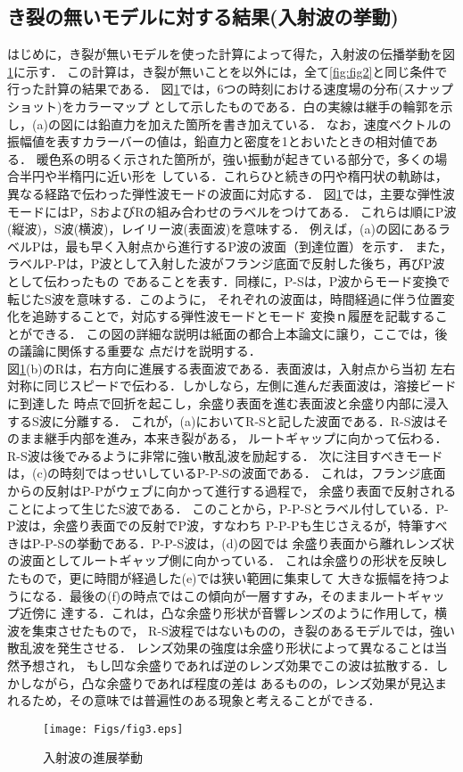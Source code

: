 \documentclass{jsce}
\begin{document}
\subsection{き裂の無いモデルに対する結果(入射波の挙動)}
はじめに，き裂が無いモデルを使った計算によって得た，入射波の伝播挙動を図\ref{fig:fig3}に示す．
この計算は，き裂が無いことを以外には，全て\ref{fig:fig2}と同じ条件で行った計算の結果である．
図\ref{fig:fig3}では，6つの時刻における速度場の分布(スナップショット)をカラーマップ
として示したものである．白の実線は継手の輪郭を示し，(a)の図には鉛直力を加えた箇所を書き加えている．
なお，速度ベクトルの振幅値を表すカラーバーの値は，鉛直力と密度を1とおいたときの相対値である．
暖色系の明るく示された箇所が，強い振動が起きている部分で，多くの場合半円や半楕円に近い形を
している．これらひと続きの円や楕円状の軌跡は，異なる経路で伝わった弾性波モードの波面に対応する．
図\ref{fig:fig3}では，主要な弾性波モードにはP，SおよびRの組み合わせのラベルをつけてある．
これらは順にP波(縦波)，S波(横波)，レイリー波(表面波)を意味する．
例えば，(a)の図にあるラベルPは，最も早く入射点から進行するP波の波面（到達位置）を示す．
また，ラベルP-Pは，P波として入射した波がフランジ底面で反射した後ち，再びP波として伝わったもの
であることを表す．同様に，P-Sは，P波からモード変換で転じたS波を意味する．このように，
それぞれの波面は，時間経過に伴う位置変化を追跡することで，対応する弾性波モードとモード
変換ｎ履歴を記載することができる．
この図の詳細な説明は紙面の都合上本論文に譲り，ここでは，後の議論に関係する重要な
点だけを説明する．\\
図\ref{fig:fig3}(b)のRは，右方向に進展する表面波である．表面波は，入射点から当初
左右対称に同じスピードで伝わる．しかしなら，左側に進んだ表面波は，溶接ビードに到達した
時点で回折を起こし，余盛り表面を進む表面波と余盛り内部に浸入するS波に分離する．
これが，(a)においてR-Sと記した波面である．R-S波はそのまま継手内部を進み，本来き裂がある，
ルートギャップに向かって伝わる．R-S波は後でみるように非常に強い散乱波を励起する．
次に注目すべきモードは，(c)の時刻ではっせいしているP-P-Sの波面である．
これは，フランジ底面からの反射はP-Pがウェブに向かって進行する過程で，
余盛り表面で反射されることによって生じたS波である．
このことから，P-P-Sとラベル付している．P-P波は，余盛り表面での反射でP波，すなわち
P-P-Pも生じさえるが，特筆すべきはP-P-Sの挙動である．P-P-S波は，(d)の図では
余盛り表面から離れレンズ状の波面としてルートギャップ側に向かっている．
これは余盛りの形状を反映したもので，更に時間が経過した(e)では狭い範囲に集束して
大きな振幅を持つようになる．最後の(f)の時点ではこの傾向が一層すすみ，そのままルートギャップ近傍に
達する．これは，凸な余盛り形状が音響レンズのように作用して，横波を集束させたもので，
R-S波程ではないものの，き裂のあるモデルでは，強い散乱波を発生させる．
レンズ効果の強度は余盛り形状によって異なることは当然予想され，
もし凹な余盛りであれば逆のレンズ効果でこの波は拡散する．しかしながら，凸な余盛りであれば程度の差は
あるものの，レンズ効果が見込まれるため，その意味では普遍性のある現象と考えることができる．
\begin{figure}[h]
	\begin{center}
	\texttt{[image: Figs/fig3.eps]} 
	\end{center}
	\caption{
		入射波の進展挙動
	} 
	\label{fig:fig3}
\end{figure}
\end{document}
